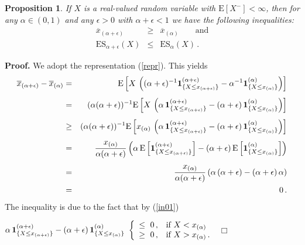 \documentclass[11pt,a4paper,leqno]{article}
\newtheorem{proposition}[theorem]{Proposition}
\begin{document}
\begin{proposition} \label{pr:non-decreasing} 
If $X$ is a real-valued random variable with $\mathrm{E}[X^-] < \infty$, then for any $\alpha \in (0,1)$ and any $\epsilon > 0$
with $\alpha + \epsilon < 1$ we have the following inequalities:
\begin{eqnarray*}
        \overline{x}_{(\alpha+\epsilon)} & \geq &
        \overline{x}_{(\alpha)} \qquad\mbox{and}\\
\mathrm{ES}_{\alpha+\epsilon}(X) & \leq & \mathrm{ES}_{\alpha}(X)\,.
\end{eqnarray*}
\end{proposition}
%
\textbf{Proof.} We adopt  the representation (\ref{repr}). This yields
\begin{eqnarray*}
\overline{x}_{(\alpha+\epsilon)} -      \overline{x}_{(\alpha)} &=&  
\mathrm{E}
\left[ 
X \,
\left(
(\alpha+\epsilon)^{-1}
{\bf 1}_{\{X\leq x_{(\alpha+\epsilon)}\}}^{(\alpha+\epsilon)} -
\alpha^{-1}
{\bf 1}_{\{X\leq x_{(\alpha)}\}}^{(\alpha)} 
\right)
\right] \\[1ex]
&=& 
(\alpha (\alpha+\epsilon))^{-1} 
\mathrm{E}
\left[ 
X \,
\left(
\alpha \,
{\bf 1}_{\{X\leq x_{(\alpha+\epsilon)}\}}^{(\alpha+\epsilon)} -
(\alpha+\epsilon) \,
{\bf 1}_{\{X\leq x_{(\alpha)}\}}^{(\alpha)} 
\right)
\right] \\[1ex]
&\geq& 
(\alpha (\alpha+\epsilon))^{-1} 
\mathrm{E}
\left[ 
x_{(\alpha)} \,
\left(
\alpha\,
{\bf 1}_{\{X\leq x_{(\alpha+\epsilon)}\}}^{(\alpha+\epsilon)} -
(\alpha+\epsilon) \,
{\bf 1}_{\{X\leq x_{(\alpha)}\}}^{(\alpha)} 
\right)
\right] \\[1ex]
&=& 
\frac{x_{(\alpha)}}{\alpha (\alpha+\epsilon)} 
\left(
\alpha\, \mathrm{E}
\left[ {\bf 1}_{\{X\leq x_{(\alpha+\epsilon)}\}}^{(\alpha+\epsilon)}
\right]
- (\alpha+\epsilon) \, 
\mathrm{E}
\left[ {\bf 1}_{\{X\leq x_{(\alpha)}\}}^{(\alpha)}
\right]
\right) \\[1ex]
&=& 
\frac{x_{(\alpha)}}{\alpha (\alpha+\epsilon)} 
\left(
\alpha\, (\alpha+\epsilon)- (\alpha+\epsilon)\,\alpha  
\right) \\
&=& 0\,.
\end{eqnarray*}
%
The inequality is due to the fact that by (\ref{in01})

\hfill
$\displaystyle
\alpha \,
{\bf 1}_{\{X\leq x_{(\alpha+\epsilon)}\}}^{(\alpha+\epsilon)} -
(\alpha+\epsilon) \,
{\bf 1}_{\{X\leq x_{(\alpha)}\}}^{(\alpha)} 
\  
\left\{
\begin{array}{c@{\,,\quad}l}
\leq\ 0 & \mbox{if}\ X<x_{(\alpha)} \\ 
\geq\ 0 & \mbox{if}\ X>x_{(\alpha)}\,.
\end{array}
\right.
$
\hfill $\Box$
\end{document}

